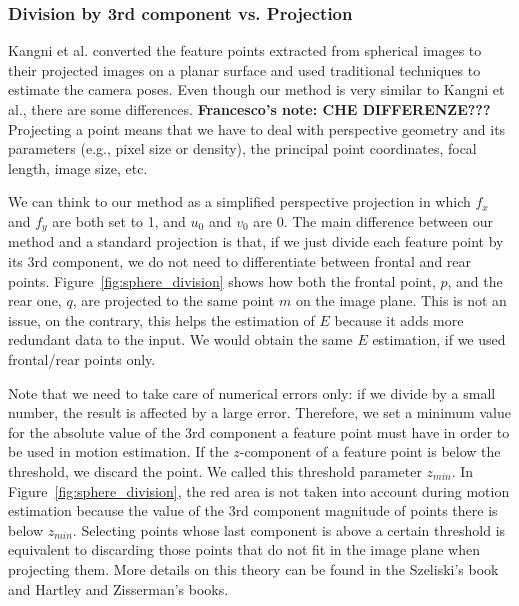 \subsubsection{Division by 3rd component vs. Projection}
%
Kangni et al.\cite{kangni2007orientation} converted the 
feature points extracted from spherical images to their projected images on a 
planar surface and used traditional techniques to estimate the camera poses.
%
Even though our method is very similar to Kangni et al., there are some differences.
\textbf{Francesco's note: CHE DIFFERENZE???}
Projecting a point means that we have to deal with perspective geometry and its
parameters (e.g., pixel size or density), the principal point coordinates, 
focal length, image size, etc.

We can think to our method as a simplified perspective projection in which
$f_x$ and $f_y$ are both set to 1, and $u_0$ and $v_0$ are 0.
The main difference between our method and a standard projection is that, if we
just divide each feature point by its 3rd component, we do not need to 
differentiate between frontal and rear points.
Figure~\ref{fig:sphere_division} shows how both the frontal point, $p$, and the 
rear one, $q$, are projected to the same point $m$ on the image plane.
This is not an issue, on the contrary, this helps the estimation of $E$ because 
it adds more redundant data to the input. We would obtain the
same $E$ estimation, if we used frontal/rear points only.

Note that we need to take care of numerical errors only: if we divide by a 
small number, the result is affected by a large error. Therefore, we
set a minimum value for the absolute value of the 3rd component a feature point must 
have in order to be used in motion estimation. If the $z$-component of a
feature point is below the threshold, we discard the point.
%
We called this threshold parameter $z_{min}$.
In Figure~\ref{fig:sphere_division}, the red area is not taken into account 
during motion estimation because the value of the 3rd component magnitude of points there 
is below $z_{min}$.
%
Selecting points whose last component is above a certain threshold is 
equivalent to discarding those points that do not fit in the image plane
when projecting them. More details on this theory can be found in the Szeliski's book\cite{szeliski2010computer} and Hartley and Zisserman's books\cite{Hartley2004}.

